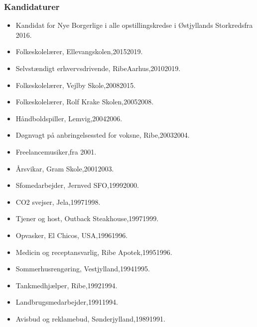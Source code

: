 \documentclass[11pt, a4paper]{awesome-cv}
\begin{document}
\begin{cvletter}
\subsubsection*{Kandidaturer}
\begin{itemize}
\item Kandidat for Nye Borgerlige i alle opstillingskredse i Østjyllands Storkredsfra 2016.
\end{itemize}
\begin{itemize}
\item Folkeskolelærer, Ellevangskolen,20152019.
\item Selvstændigt erhvervsdrivende, RibeAarhus,20102019.
\item Folkeskolelærer, Vejlby Skole,20082015.
\item Folkeskolelærer, Rolf Krake Skolen,20052008.
\item Håndboldspiller, Lemvig,20042006.
\item Døgnvagt på anbringelsessted for voksne, Ribe,20032004.
\item Freelancemusiker,fra 2001.
\item Årsvikar, Gram Skole,20012003.
\item Sfomedarbejder, Jernved SFO,19992000.
\item CO2 svejser, Jela,19971998.
\item Tjener og host, Outback Steakhouse,19971999.
\item Opvasker, El Chicos, USA,19961996.
\item Medicin og receptansvarlig, Ribe Apotek,19951996.
\item Sommerhusrengøring, Vestjylland,19941995.
\item Tankmedhjælper, Ribe,19921994.
\item Landbrugsmedarbejder,19911994.
\item Avisbud og reklamebud, Sønderjylland,19891991.
\end{itemize}
\end{cvletter}
\end{document}
